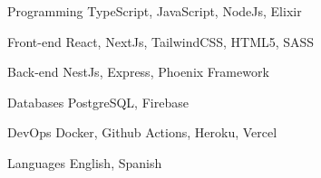 

\begin{cvskills}

  \cvskill
    {Programming} %
    {TypeScript, JavaScript, NodeJs, Elixir} %

  \cvskill
    {Front-end} %
    {React, NextJs, TailwindCSS, HTML5, SASS} %

  \cvskill
    {Back-end} %
    {NestJs, Express, Phoenix Framework} %

  \cvskill
    {Databases} %
    {PostgreSQL, Firebase} %

  \cvskill
    {DevOps} %
    {Docker, Github Actions, Heroku, Vercel} %

  \cvskill
    {Languages} %
    {English, Spanish} %

\end{cvskills}
